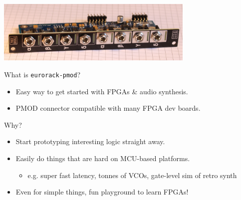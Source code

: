 \documentclass{beamer}
\begin{document}
\begin{frame}{}

    \begin{center}
        \includegraphics[height=3cm]{img/eurorack-pmod.jpg}
    \end{center}

    \begin{block}{What is \texttt{eurorack-pmod}?}
        \begin{itemize}
            \item Easy way to get started with FPGAs \& audio synthesis.
            \item PMOD connector compatible with many FPGA dev boards.
        \end{itemize}
    \end{block}

    \begin{block}{Why?}
        \begin{itemize}
            \item Start prototyping interesting logic straight away.
            \item Easily do things that are hard on MCU-based platforms.
                \begin{itemize}
                    \item e.g. super fast latency, tonnes of VCOs, gate-level sim of retro synth
                \end{itemize}
            \item Even for simple things, fun playground to learn FPGAs!
        \end{itemize}
    \end{block}

\end{frame}
\end{document}
